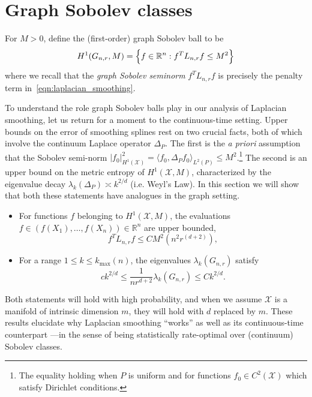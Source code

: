 \documentclass{article}
\newcommand{\Reals}{\mathbb{R}}
\newcommand{\1}{\mathbf{1}}
\newcommand{\Lap}{L}
\newcommand{\Xset}{\mathcal{X}}
\newcommand{\Leb}{L}
\theoremstyle{alden}
\theoremstyle{aldenthm}
\theoremstyle{definition}
\theoremstyle{remark}
\begin{document}
\section{Graph Sobolev classes}
\label{sec:graph_sobolev_classes}

For $M > 0$, define the (first-order) graph Sobolev ball to be
\begin{equation}
\label{eqn:graph_sobolev_ball}
H^1(G_{n,r},M) = \Bigl\{f \in \Reals^n: f^T \Lap_{n,r} f \leq M^2\Bigr\}
\end{equation}
where we recall that the \emph{graph Sobolev seminorm} $f^T \Lap_{{n,r}} f$ is precisely the penalty term in~\eqref{eqn:laplacian_smoothing}. 

To understand the role graph Sobolev balls play in our analysis of Laplacian smoothing, let us return for a moment to the continuous-time setting. Upper bounds on the error of smoothing splines rest on two crucial facts, both of which involve the continuum Laplace operator $\Delta_P$. The first is the \textit{a priori} assumption that the Sobolev semi-norm $|f_0|_{H^1(\Xset)}^2 = \langle f_0, \Delta_P f_0 \rangle_{\Leb^2(P)} \leq M^2$.\footnote{The equality holding when $P$ is uniform and  for functions $f_0 \in C^2(\Xset)$ which satisfy Dirichlet conditions.} The second is an upper bound on the metric entropy of $H^1(\Xset,M)$, characterized by the eigenvalue decay $\lambda_k(\Delta_P) \asymp k^{2/d}$ (i.e. Weyl's Law). In this section we will show that both these statements have analogues in the graph setting.
\begin{itemize}
	\item For functions $f$ belonging to $H^1(\Xset,M)$, the evaluations $f \in (f(X_1),\ldots,f(X_n)) \in \Reals^n$ are upper bounded,
	\begin{equation}
	\label{eqn:graph_sobolev_seminorm_vague}
	f^T \Lap_{n,r} f \leq C M^2(n^{2}r^{(d + 2)}),
	\end{equation}
	\item For a range $1 \leq k \leq k_{\max}(n)$, the eigenvalues $\lambda_k(G_{n,r})$ satisfy
	\begin{equation}
	\label{eqn:neighborhood_graph_eigenvalue_vague}
	ck^{2/d} \leq \frac{1}{nr^{d + 2}} \lambda_k(G_{n,r})  \leq Ck^{2/d}.
	\end{equation}
\end{itemize}
Both statements will hold with high probability, and when we assume $\Xset$ is a manifold of intrinsic dimension $m$, they will hold with $d$ replaced by $m$.  These results elucidate why Laplacian smoothing ``works'' as well as its continuous-time counterpart ---in the sense of being statistically rate-optimal over (continuum) Sobolev classes.
\end{document}
